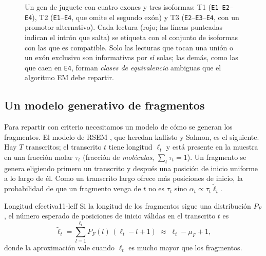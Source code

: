 \begin{figure}[t]
\begin{tikzpicture}[font=\sffamily\scriptsize,x=1cm,y=1cm]
\end{tikzpicture}
\caption[Isoformas y lecturas ambiguas]{Un gen de juguete con cuatro exones y tres isoformas: T1 (\texttt{E1}--\texttt{E2}--\texttt{E4}), T2 (\texttt{E1}--\texttt{E4}, que omite el segundo exón) y T3 (\texttt{E2}--\texttt{E3}--\texttt{E4}, con un promotor alternativo). Cada lectura (rojo; las líneas punteadas indican el intrón que salta) se etiqueta con el conjunto de isoformas con las que es compatible. Solo las lecturas que tocan una unión o un exón exclusivo son informativas por sí solas; las demás, como las que caen en \texttt{E4}, forman \emph{clases de equivalencia} ambiguas que el algoritmo EM debe repartir.}
\label{fig:11-isoformas}
\end{figure}

\subsection{Un modelo generativo de fragmentos}

Para repartir con criterio necesitamos un modelo de cómo se generan los fragmentos. El modelo de RSEM \parencite{c11-li2011}, que heredan kallisto y Salmon, es el siguiente. Hay $T$ transcritos; el transcrito $t$ tiene longitud $\ell_t$ y está presente en la muestra en una fracción molar $\tau_t$ (fracción de \emph{moléculas}, $\sum_t\tau_t=1$). Un fragmento se genera eligiendo primero un transcrito y después una posición de inicio uniforme a lo largo de él. Como un transcrito largo ofrece más posiciones de inicio, la probabilidad de que un fragmento venga de $t$ no es $\tau_t$ sino $\alpha_t\propto\tau_t\tilde\ell_t$.

\begin{definicion}{Longitud efectiva}{11-leff}
Si la longitud de los fragmentos sigue una distribución $P_F$, el número esperado de posiciones de inicio válidas en el transcrito $t$ es
\begin{equation}\label{eq:11-leff}
\tilde\ell_t=\sum_{l=1}^{\ell_t} P_F(l)\,(\ell_t-l+1)\;\approx\;\ell_t-\mu_F+1,
\end{equation}
donde la aproximación vale cuando $\ell_t$ es mucho mayor que los fragmentos.
\end{definicion}

\begin{simbolos}
\end{simbolos}

